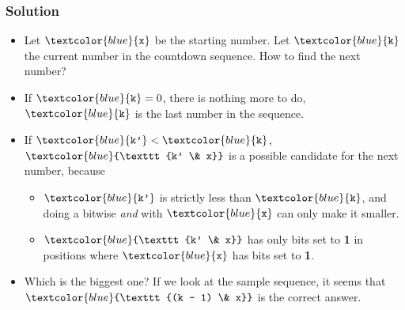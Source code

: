 \documentclass{beamer}
\begin{document}
\begin{frame}[fragile]
\frametitle{Solution}

\footnotesize

\begin{itemize}

\item Let $\textcolor{blue}{\texttt{x}}$ be the starting number. Let $\textcolor{blue}{\texttt{k}}$ the current number in the countdown sequence.
How to find the next number?

\vspace{0.2cm}

\item<2-> If $\textcolor{blue}{\texttt{k}} = 0$, there is nothing more to do, $\textcolor{blue}{\texttt{k}}$ is the last number in the sequence.

\vspace{0.2cm}

\item<3-> If $\textcolor{blue}{\texttt{k'}} < \textcolor{blue}{\texttt{k}}$, $\textcolor{blue}{\texttt{k' \& x}}$ is a possible candidate for the next number, because
\begin{itemize}
\footnotesize
\item<3-> $\textcolor{blue}{\texttt{k'}}$ is strictly less than $\textcolor{blue}{\texttt{k}}$,
and doing a bitwise \emph{and} with $\textcolor{blue}{\texttt{x}}$ can only make it smaller.
\vspace{0.1cm}

\item<4-> $\textcolor{blue}{\texttt{k' \& x}}$ has only bits set to \textbf{1} in positions where $\textcolor{blue}{\texttt{x}}$ has bits set to \textbf{1}.
\end{itemize}

\vspace{0.2cm}

\item<5-> Which is the biggest one? If we look at the sample sequence, it seems that $\textcolor{blue}{\texttt{(k - 1) \& x}}$ is the correct answer.

\end{itemize}

\end{frame}
\end{document}
